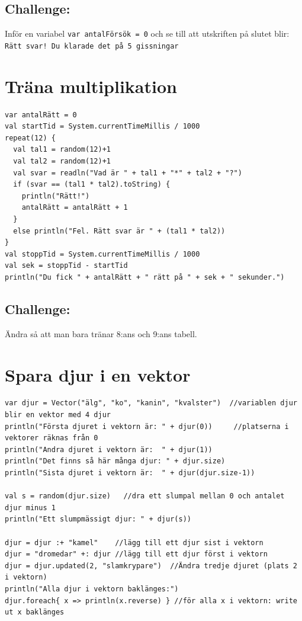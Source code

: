 \section*{\color{BrickRed}Challenge:}
Inför en variabel \lstinline{var antalFörsök = 0} och se till att utskriften på slutet blir:\\
\lstinline{Rätt svar! Du klarade det på 5 gissningar}
\chapter{Träna multiplikation}
\begin{lstlisting}[basicstyle={\ttfamily\fontsize{16}{19}\selectfont},numbers=none]
var antalRätt = 0
val startTid = System.currentTimeMillis / 1000
repeat(12) {
  val tal1 = random(12)+1
  val tal2 = random(12)+1
  val svar = readln("Vad är " + tal1 + "*" + tal2 + "?")
  if (svar == (tal1 * tal2).toString) {
    println("Rätt!")
    antalRätt = antalRätt + 1
  }
  else println("Fel. Rätt svar är " + (tal1 * tal2))
}
val stoppTid = System.currentTimeMillis / 1000
val sek = stoppTid - startTid
println("Du fick " + antalRätt + " rätt på " + sek + " sekunder.")
\end{lstlisting}
        
\section*{\color{BrickRed}Challenge:}
Ändra så att man bara tränar 8:ans och 9:ans tabell.
\chapter{Spara djur i en vektor}
\begin{lstlisting}[basicstyle={\ttfamily\fontsize{14}{17}\selectfont},numbers=none]
var djur = Vector("älg", "ko", "kanin", "kvalster")  //variablen djur blir en vektor med 4 djur
println("Första djuret i vektorn är: " + djur(0))     //platserna i vektorer räknas från 0
println("Andra djuret i vektorn är:  " + djur(1))
println("Det finns så här många djur: " + djur.size)
println("Sista djuret i vektorn är:  " + djur(djur.size-1))

val s = random(djur.size)   //dra ett slumpal mellan 0 och antalet djur minus 1
println("Ett slumpmässigt djur: " + djur(s))

djur = djur :+ "kamel"    //lägg till ett djur sist i vektorn
djur = "dromedar" +: djur //lägg till ett djur först i vektorn
djur = djur.updated(2, "slamkrypare")  //Ändra tredje djuret (plats 2 i vektorn)
println("Alla djur i vektorn baklänges:")
djur.foreach{ x => println(x.reverse) } //för alla x i vektorn: write ut x baklänges
\end{lstlisting}
        
